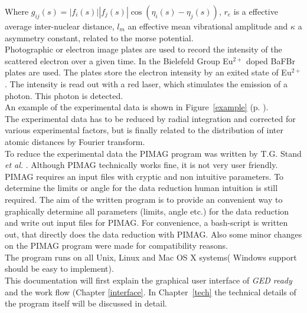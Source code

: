  Where $g_{ij}(s) = |f_i(s)||f_j(s)|\cos(\eta_i(s) - \eta_j(s))$, $r_e$ is a effective average inter-nuclear distance, $l_m$ an effective mean vibrational amplitude and $\kappa$ a asymmetry constant, related to the morse potential. \\
 Photographic or electron image plates are used to record the intensity of the scattered electron over a given time. In the Bielefeld Group Eu$^{2+}$ doped BaFBr plates are used. The plates store the electron intensity by an exited state of Eu$^{2+}$. The intensity is read out with a red laser, which stimulates the emission of a photon. This photon is detected.  \\
An example of the experimental data is shown in Figure~\ref{example} (p. \pageref{example}).\\
The experimental data has to be reduced by radial integration and corrected for various experimental factors, but is finally related to the distribution of inter atomic distances by Fourier transform. \cite{gedbook}\\
To reduce the experimental data the PIMAG program was written by  T.G. Stand \textit{et al.} \cite{pimag}. Although PIMAG technically works fine, it is not very user friendly. PIMAG requires an input files with cryptic and non intuitive parameters.  To determine the limits or angle for the data reduction human intuition is still required. The aim of the written program is to provide an convenient way to graphically determine all parameters (limits, angle etc.) for the data reduction and write out input files for PIMAG. For convenience, a bash-script is written out, that directly does the data reduction with PIMAG. Also some minor changes on the PIMAG program were made for compatibility reasons. \\
The program runs on all Unix, Linux and Mac OS X systems( Windows support should be easy to implement). \\
This documentation will first explain the graphical user interface of \textit{GED ready} and the work flow (Chapter \ref{interface}. In Chapter~\ref{tech} the technical details of the program itself will be discussed in detail. 
 
